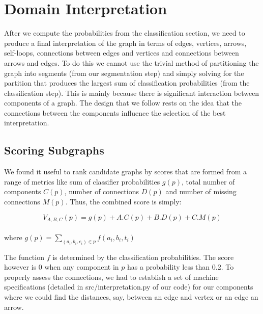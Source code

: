\section{Domain Interpretation}
\label{sec:interpretation}
After we compute the probabilities from the classification section, we need to produce a final interpretation of the graph in terms of edges, vertices, arrows, self-loops, connections between edges and vertices and connections between arrows and edges. To do this we cannot use the trivial method of partitioning the graph into segments (from our segmentation step) and simply solving for the partition that produces the largest sum of classification probabilities (from the classification step). This is mainly because there is significant interaction between components of a graph. The design that we follow rests on the idea that the connections between the components influence the selection of the best interpretation.\\

\subsection{Scoring Subgraphs}

We found it useful to rank candidate graphs by scores that are formed from a range of metrics like sum of classifier probabilities $g(p)$, total number of components $C(p)$, number of connections $D(p)$ and number of missing connections $M(p)$. Thus, the combined score is simply: 

\begin{equation}
  V_{A,B,C}(p) = g(p) + A.C(p) + B.D(p) + C.M(p)
\end{equation} \\
where $g(p) = \sum_{(a_i,b_i,c_i) \in p}f(a_i, b_i, t_i)$

The function $f$ is determined by the classification probabilities. The score however is 0 when any component in $p$ has a probability less than 0.2. To properly assess the connections, we had to establish a set of machine specifications (detailed in src/interpretation.py of our code) for our components where we could find the distances, say, between an edge and vertex or an edge an arrow.\\

